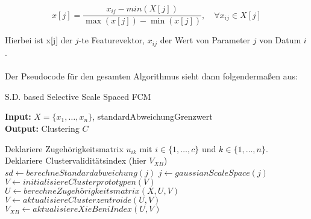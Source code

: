 \documentclass[11pt,ceqn]{book}
\begin{document}
$$x[j] = \frac{x_{ij}-min(X[j])}{\max(x[j])-\min(x[j])},\quad \forall x_{ij} \in X[j]$$

Hierbei ist x[j] der $j$-te Featurevektor, $x_{ij}$ der Wert von Parameter $j$ von Datum $i$.
\\~\\
Der Pseudocode für den gesamten Algorithmus sieht dann folgendermaßen aus:

\begin{algorithm}[H]
\caption{S.D. based Selective Scale Spaced FCM}\label{sdbsssfcm}
\hspace*{\algorithmicindent} \textbf{Input:} $X=\{x_1,\dots,x_n\}$, standardAbweichungGrenzwert\\
 \hspace*{\algorithmicindent} \textbf{Output:} Clustering $C$ 
\begin{algorithmic}[1]
\State Deklariere Zugehörigkeitsmatrix $u_{ik}$ mit $i\in \{1,\dots,c\}$ und $k \in \{1,\dots,n\}$.
\State Deklariere Clustervaliditätsindex (hier $V_{XB}$)
	\State $sd \gets berechneStandardabweichung(j)$
		 \State $j \gets gaussianScaleSpace(j)$ 
	\EndIf
\EndFor
\State $V\gets initialisiereClusterprototypen(V)$
	\State $U\gets berechneZugehörigkeitsmatrix(X,U,V)$
	\State $V\gets aktualisiereClusterzentroide(U,V)$
	\State $V_{XB} \gets aktualisiereXieBeniIndex(U,V)$
\EndWhile
\end{algorithmic}
\end{algorithm}

\clearpage
\end{document}
